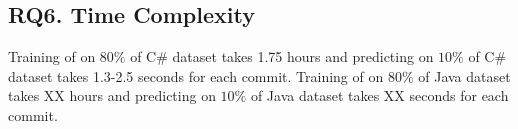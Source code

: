 \subsection{RQ6. Time Complexity}

Training of \tool on $80\%$ of C\# dataset takes 1.75 hours and predicting on $10\%$ of C\# dataset takes 1.3-2.5 seconds for each commit. Training of \tool on $80\%$ of Java dataset takes XX hours and predicting on $10\%$ of Java dataset takes XX seconds for each commit.
